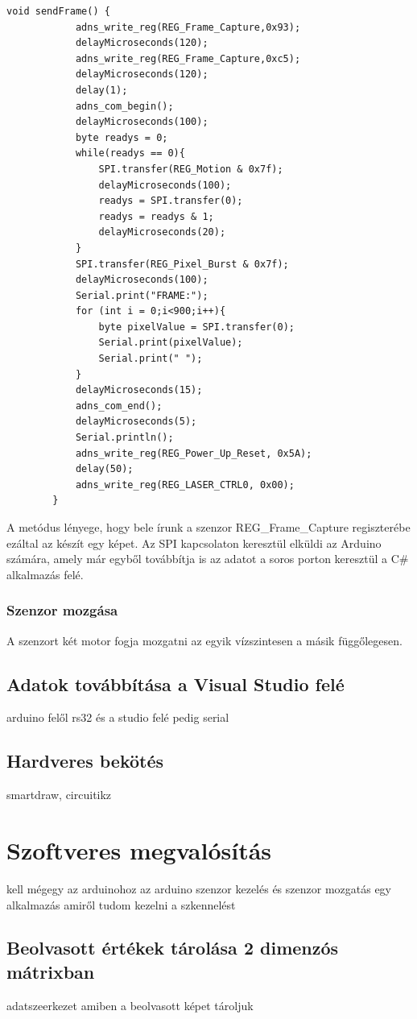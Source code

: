 \documentclass[]{thesis-ekf}
\theoremstyle{definition}
\theoremstyle{remark}
\begin{document}
\begin{enumerate}
{\begin{lstlisting}[language=Arduino,label=sendFrame,caption=sendFrame metódus]
		void sendFrame() {
			adns_write_reg(REG_Frame_Capture,0x93);
			delayMicroseconds(120); 
			adns_write_reg(REG_Frame_Capture,0xc5);
			delayMicroseconds(120); 
			delay(1); 
			adns_com_begin(); 
			delayMicroseconds(100); 
			byte readys = 0;
			while(readys == 0){
				SPI.transfer(REG_Motion & 0x7f);
				delayMicroseconds(100); 
				readys = SPI.transfer(0); 
				readys = readys & 1;
				delayMicroseconds(20);
			}
			SPI.transfer(REG_Pixel_Burst & 0x7f); 
			delayMicroseconds(100); 
			Serial.print("FRAME:");
			for (int i = 0;i<900;i++){
				byte pixelValue = SPI.transfer(0);  
				Serial.print(pixelValue);
				Serial.print(" ");
			}
			delayMicroseconds(15); 
			adns_com_end();  
			delayMicroseconds(5); 
			Serial.println();
			adns_write_reg(REG_Power_Up_Reset, 0x5A);
			delay(50);
			adns_write_reg(REG_LASER_CTRL0, 0x00);
		}
	\end{lstlisting}
	}
	A metódus lényege, hogy bele írunk a szenzor REG\_Frame\_Capture regiszterébe ezáltal az készít egy képet. Az SPI kapcsolaton keresztül elküldi az Arduino számára, amely már egyből továbbítja is az adatot a soros porton keresztül a C\# alkalmazás felé.
\end{enumerate}

\subsection{Szenzor mozgása}
A szenzort két motor fogja mozgatni az egyik vízszintesen a másik függőlegesen. 
\section{Adatok továbbítása a Visual Studio felé}
arduino felől rs32 és a studio felé pedig serial
\section{Hardveres bekötés}
smartdraw, circuitikz
\chapter{Szoftveres megvalósítás}
kell mégegy az arduinohoz az arduino szenzor kezelés és szenzor mozgatás
egy alkalmazás amiről tudom kezelni a szkennelést
\section{Beolvasott értékek tárolása 2 dimenzós mátrixban}
adatszeerkezet amiben a beolvasott képet tároljuk
\end{document}
